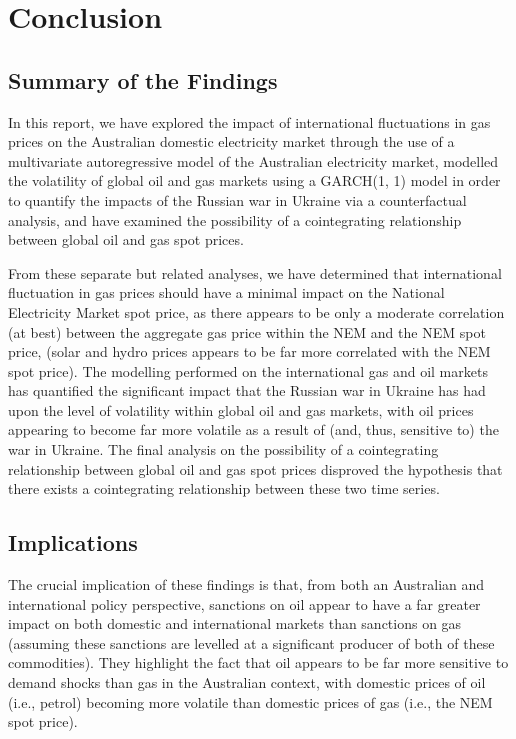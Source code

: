 \section{Conclusion}
\subsection{Summary of the Findings}
In this report, we have explored the impact of international fluctuations in gas prices on the Australian
domestic electricity market through the use of a multivariate autoregressive model of the Australian electricity
market, modelled the volatility of global oil and gas markets using a GARCH(1, 1) model in order to quantify
the impacts of the Russian war in Ukraine via a counterfactual analysis, and have examined the possibility of
a cointegrating relationship between global oil and gas spot prices.
\medskip

From these separate but related analyses, we have determined that international fluctuation in gas prices
should have a minimal impact on the National Electricity Market spot price, as there appears to be only a
moderate correlation (at best) between the aggregate gas price within the NEM and the NEM spot price,
(solar and hydro prices appears to be far more correlated with the NEM spot price). The modelling
performed on the international gas and oil markets has quantified the significant impact that the Russian
war in Ukraine has had upon the level of volatility within global oil and gas markets, with oil prices appearing
to become far more volatile as a result of (and, thus, sensitive to) the war in Ukraine. The final analysis on the
possibility of a cointegrating relationship between global oil and gas spot prices disproved the hypothesis
that there exists a cointegrating relationship between these two time series.
\subsection{Implications}
The crucial implication of these findings is that, from both an Australian and international policy perspective,
sanctions on oil appear to have a far greater impact on both domestic and international markets than
sanctions on gas (assuming these sanctions are levelled at a significant producer of both of these
commodities). They highlight the fact that oil appears to be far more sensitive to demand shocks than gas in
the Australian context, with domestic prices of oil (i.e., petrol) becoming more volatile than domestic prices
of gas (i.e., the NEM spot price).

